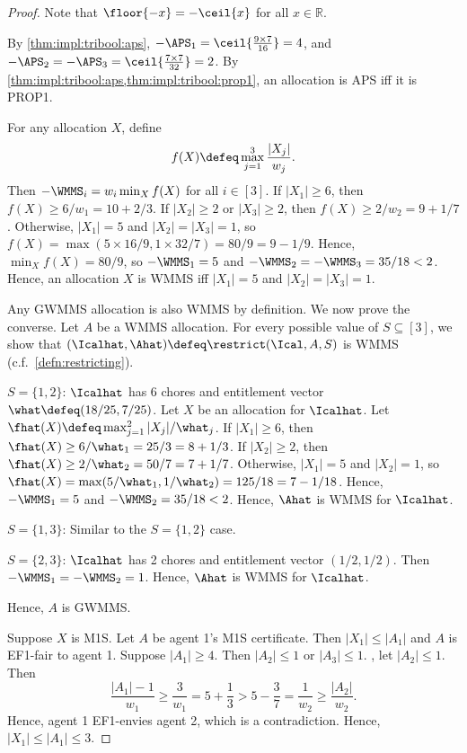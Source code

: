 \begin{proof}
Note that $\floor{-x} = -\ceil{x}$ for all $x \in \mathbb{R}$.

By \cref{thm:impl:tribool:aps}, $-\APS_1 = \ceil{\frac{9 \times 7}{16}} = 4$,
and $-\APS_2 = -\APS_3 = \ceil{\frac{7 \times 7}{32}} = 2$.
By \cref{thm:impl:tribool:aps,thm:impl:tribool:prop1},
an allocation is APS iff it is PROP1.

For any allocation $X$, define
\[ f(X) \defeq \max_{j=1}^3 \frac{|X_j|}{w_j}. \]
Then $-\WMMS_i = w_i\min_X f(X)$ for all $i \in [3]$.
If $|X_1| \ge 6$, then $f(X) \ge 6/w_1 = 10 + 2/3$.
If $|X_2| \ge 2$ or $|X_3| \ge 2$, then $f(X) \ge 2/w_2 = 9 + 1/7$.
Otherwise, $|X_1| = 5$ and $|X_2| = |X_3| = 1$,
so $f(X) = \max(5 \times 16/9, 1 \times 32/7) = 80/9 = 9 - 1/9$.
Hence, $\min_X f(X) = 80/9$, so $-\WMMS_1 = 5$ and $-\WMMS_2 = -\WMMS_3 = 35/18 < 2$.
Hence, an allocation $X$ is WMMS iff $|X_1| = 5$ and $|X_2| = |X_3| = 1$.

Any GWMMS allocation is also WMMS by definition. We now prove the converse.
Let $A$ be a WMMS allocation. For every possible value of $S \subseteq [3]$,
we show that $(\Icalhat, \Ahat) \defeq \restrict(\Ical, A, S)$ is WMMS
(c.f.~\cref{defn:restricting}).
\begin{tightenum}
\item $S = \{1, 2\}$:
    $\Icalhat$ has 6 chores and entitlement vector $\what \defeq (18/25, 7/25)$.
    Let $X$ be an allocation for $\Icalhat$.
    Let $\fhat(X) \defeq \max_{j=1}^2 |X_j|/\what_j$.
    If $|X_1| \ge 6$, then $\fhat(X) \ge 6/\what_1 = 25/3 = 8 + 1/3$.
    If $|X_2| \ge 2$, then $\fhat(X) \ge 2/\what_2 = 50/7 = 7 + 1/7$.
    Otherwise, $|X_1| = 5$ and $|X_2| = 1$, so
    $\fhat(X) = \max(5/\what_1, 1/\what_2) = 125/18 = 7 - 1/18$.
    Hence, $-\WMMS_1 = 5$ and $-\WMMS_2 = 35/18 < 2$.
    Hence, $\Ahat$ is WMMS for $\Icalhat$.
\item $S = \{1, 3\}$:
    Similar to the $S = \{1, 2\}$ case.
\item $S = \{2, 3\}$:
    $\Icalhat$ has 2 chores and entitlement vector $(1/2, 1/2)$.
    Then $-\WMMS_1 = -\WMMS_2 = 1$.
    Hence, $\Ahat$ is WMMS for $\Icalhat$.
\end{tightenum}
Hence, $A$ is GWMMS.

Suppose $X$ is M1S. Let $A$ be agent 1's M1S certificate.
Then $|X_1| \le |A_1|$ and $A$ is EF1-fair to agent 1.
Suppose $|A_1| \ge 4$. Then $|A_2| \le 1$ or $|A_3| \le 1$. \WLoG{}, let $|A_2| \le 1$. Then
\[ \frac{|A_1|-1}{w_1} \ge \frac{3}{w_1} = 5 + \frac{1}{3} > 5 - \frac{3}{7} = \frac{1}{w_2} \ge \frac{|A_2|}{w_2}. \]
Hence, agent 1 EF1-envies agent 2, which is a contradiction.
Hence, $|X_1| \le |A_1| \le 3$.


\end{proof}
